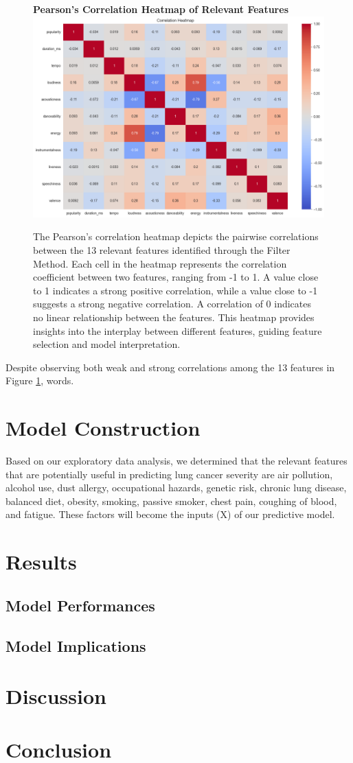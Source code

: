 \documentclass[times, twocolumn]{article}
\begin{document}
\begin{figure}[H]
    \begin{minipage}{1\textwidth}
        \centering
        \textbf{Pearson's Correlation Heatmap of Relevant Features}
        \includegraphics[width=0.5\linewidth]{corr_heatmap.png}
        \caption{The Pearson's correlation heatmap depicts the pairwise correlations between the 13 relevant features identified through the Filter Method. Each cell in the heatmap represents the correlation coefficient between two features, ranging from -1 to 1. A value close to 1 indicates a strong positive correlation, while a value close to -1 suggests a strong negative correlation. A correlation of 0 indicates no linear relationship between the features. This heatmap provides insights into the interplay between different features, guiding feature selection and model interpretation.}
        \label{heatmap}
    \end{minipage}%
\end{figure}

Despite observing both weak and strong correlations among the 13 features in Figure \ref{heatmap}, words.

\section{Model Construction}
Based on our exploratory data analysis, we determined that the relevant features that are potentially useful in predicting lung cancer severity are air pollution, alcohol use, dust allergy, occupational hazards, genetic risk, chronic lung disease, balanced diet, obesity, smoking, passive smoker, chest pain, coughing of blood, and fatigue. These factors will become the inputs (X) of our predictive model.

\section{Results}
\subsection{Model Performances}


\subsection{Model Implications}

\section{Discussion}

\section{Conclusion}

\printbibliography
\end{document}
